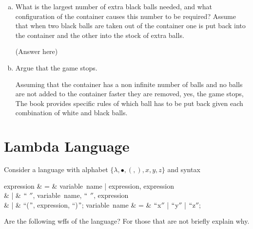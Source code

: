 \documentclass[11pt]{article}
\begin{document}
\begin{enumerate}[(a)]
        \item What is the largest number of extra black balls
        needed, and what configuration of the container causes this number to be required?
        Assume that when two black balls are taken out of the container one is put back into the container and the other into the stock of extra balls.

        (Answer here)

        \item Argue that the game stops.

        Assuming that the container has a non infinite number of balls and no balls are not added to the container faster they are removed, yes, the game stops, The book
        provides specific rules of which ball has to be put back given each combination of white and black balls.

    \end{enumerate}
    \section{Lambda Language}
    Consider a language with alphabet $\{ \lambda, \bullet, (, ), x, y, z \}$ and syntax

    \begin{syntax}
        expression  & =  & variable~name | expression, expression\\
        & | & $``$ \lambda $''$, variable~name, $``$ \bullet $''$, expression\\
        & | & ``($"$, expression, ``)$"$;
        \also
        variable~name & = & $``$x$''$ | $``$y$''$ | $``$z$''$;
    \end{syntax}

    Are the following wffs of the language? For those that are not briefly explain why.
\end{document}
